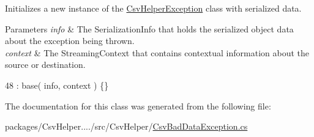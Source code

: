 Initializes a new instance of the \hyperlink{a00044}{Csv\-Helper\-Exception} class with serialized data. 


\begin{DoxyParams}{Parameters}
{\em info} & The Serialization\-Info that holds the serialized object data about the exception being thrown.\\
\hline
{\em context} & The Streaming\-Context that contains contextual information about the source or destination.\\
\hline
\end{DoxyParams}

\begin{DoxyCode}
48 : base( info, context ) \{\}
\end{DoxyCode}


The documentation for this class was generated from the following file\-:\begin{DoxyCompactItemize}
\item 
packages/\-Csv\-Helper..../src/\-Csv\-Helper/\hyperlink{a00193}{Csv\-Bad\-Data\-Exception.\-cs}\end{DoxyCompactItemize}

